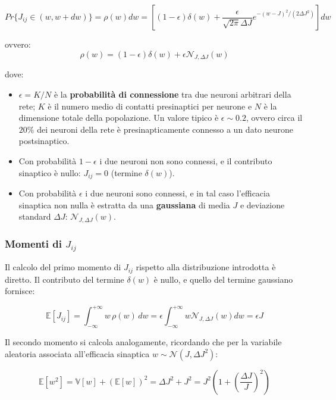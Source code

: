\begin{equation}
Pr\{J_{ij} \in (w, w+dw)\} = \rho(w)dw = \left[ (1 - \epsilon)\delta(w) + \frac{\epsilon}{\sqrt{2\pi}\Delta J}e^{-(w-J)^2/(2\Delta J^2)} \right] dw
\end{equation}

ovvero:
\begin{equation}
\rho(w) = (1 - \epsilon)\delta(w) + \epsilon \mathcal{N}_{J, \Delta J}(w)
\end{equation}

dove:
\begin{itemize}
    \item $\epsilon = K/N$ è la \textbf{probabilità di connessione} tra due neuroni arbitrari della rete; $K$ è il numero medio di contatti presinaptici per neurone e $N$ è la dimensione totale della popolazione. Un valore tipico è $\epsilon \sim 0.2$, ovvero circa il $20\%$ dei neuroni della rete è presinapticamente connesso a un dato neurone postsinaptico.
    \item Con probabilità $1 - \epsilon$ i due neuroni non sono connessi, e il contributo sinaptico è nullo: $J_{ij} = 0$ (termine $\delta(w)$).
    \item Con probabilità $\epsilon$ i due neuroni sono connessi, e in tal caso l'efficacia sinaptica non nulla è estratta da una \textbf{gaussiana} di media $J$ e deviazione standard $\Delta J$: $\mathcal{N}_{J, \Delta J}(w)$.
\end{itemize}



\subsubsection{Momenti di $J_{ij}$}

Il calcolo del primo momento di $J_{ij}$ rispetto alla distribuzione introdotta è diretto. Il contributo del termine $\delta(w)$ è nullo, e quello del termine gaussiano fornisce:

\begin{equation}
\mathbb{E}[J_{ij}] = \int_{-\infty}^{+\infty} w \, \rho(w) \, dw = \epsilon \int_{-\infty}^{+\infty} w \mathcal{N}_{J, \Delta J}(w) dw = \epsilon J
\end{equation}

Il secondo momento si calcola analogamente, ricordando che per la variabile aleatoria associata all'efficacia sinaptica $w \sim \mathcal{N}(J, \Delta J^2)$:

\begin{equation}
\mathbb{E}[w^2] = \mathbb{V}[w] + (\mathbb{E}[w])^2 = \Delta J^2 + J^2 = J^2 \left( 1 + \left(\frac{\Delta J}{J}\right)^2 \right)
\end{equation}

